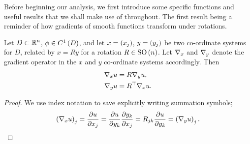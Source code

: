 Before beginning our analysis, we first introduce some specific functions and useful results that we shall make use of throughout.
The first result being a reminder of how gradients of smooth functions transform under rotations.
\begin{lemma} \label{lem:SmoothGradientsUnderRotation}
	Let $D\subset\mathbb{R}^n$, $\phi\in C^1\left( D \right)$, and let $x=\left( x_j \right)$, $y=\left( y_j \right)$ be two co-ordinate systems for $D$, related by $x=Ry$ for a rotation $R\in\mathrm{SO}\left( n \right)$.
	Let $\nabla_x$ and $\nabla_y$ denote the gradient operator in the $x$ and $y$ co-ordinate systems accordingly.
	Then
	\begin{align*}
		\nabla_x u &= R \nabla_y u, \\
		\nabla_y u &= R^{\top} \nabla_x u.
	\end{align*}
\end{lemma}
\begin{proof}
	We use index notation to save explicitly writing summation symbols;
	\begin{align*}
		\left( \nabla_x u \right)_j = \dfrac{\partial u}{\partial x_j} 
		= \dfrac{\partial u}{\partial y_k}\dfrac{\partial y_k}{\partial x_j}
		= R_{jk}\dfrac{\partial u}{\partial y_k} 
		= \left( \nabla_y u \right)_j.
	\end{align*}
\end{proof}


